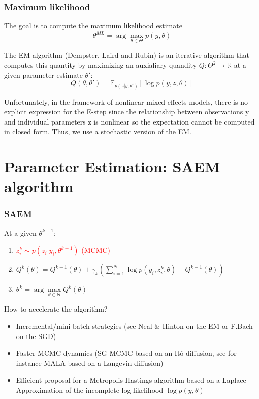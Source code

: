 \documentclass[xcolor={dvipsnames}]{beamer}
\begin{document}
\begin{frame}
\frametitle{Maximum likelihood}

The goal is to compute the maximum likelihood estimate
\begin{equation}
\theta^{ML} = \arg \max \limits_{\theta \in \Theta} p(y,\theta)
\end{equation}

The EM algorithm (Dempster, Laird and Rubin) is an iterative algorithm that computes this quantity by maximizing an auxialiary quandity $Q: \Theta^2 \to \mathbb{R}$ at a given parameter estimate $\theta'$:
\begin{equation}
Q(\theta, \theta') = \mathbb{E}_{p(z|y,\theta')}\left[ \log p(y, z, \theta) \right]
\end{equation}

Unfortunately, in the framework of nonlinear mixed effects models, there is no explicit expression for the E-step since the relationship between observations y and individual parameters z is nonlinear so the expectation cannot be computed in closed form. Thus, we use a stochastic version of the EM.
\end{frame}



\section{Parameter Estimation: SAEM algorithm}

\begin{frame}
\frametitle{SAEM}
At a given $\theta^{k-1}$:
\begin{enumerate}
  \item \textcolor{red}{$z_i^k \sim p(z_i|y_i,\theta^{k-1})$ \quad (MCMC)}
  \item $Q^k(\theta) = Q^{k-1}(\theta)+ \gamma_k(\sum_{i=1}^{N}{\log p(y_i, z_i^k, \theta)} - Q^{k-1}(\theta))$
  \item $\theta ^k = \arg \max \limits_{\theta \in \Theta} Q^k(\theta)$
\end{enumerate}


How to accelerate the algorithm?
\begin{itemize}
  \item Incremental/mini-batch strategies (see Neal $\&$ Hinton on the EM or F.Bach on the SGD)
  \item Faster MCMC dynamics (SG-MCMC based on an Itô diffusion, see for instance MALA based on a Langevin diffusion)
  \item Efficient proposal for a Metropolis Hastings algorithm based on a Laplace Approximation of the incomplete log likelihood $\log p(y,\theta)$
\end{itemize}


\end{frame}
\end{document}
